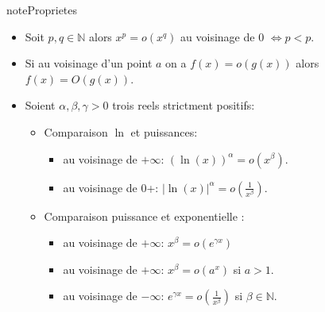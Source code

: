 \documentclass[letterpaper,10pt,french]{jupyterBook}
\begin{document}
\begin{sphinxadmonition}{note}{Proprietes}
\begin{itemize}
\item {} 
\sphinxAtStartPar
Soit \(p, q \in \mathbb{N}\) alors \(x^p = o(x^q)\) au voisinage de \(0\) \(\Leftrightarrow p<p\).

\item {} 
\sphinxAtStartPar
Si au voisinage d’un point \(a\) on a \(f(x) = o(g(x))\) alors \(f(x) = O(g(x))\).

\item {} 
\sphinxAtStartPar
Soient \(\alpha, \beta, \gamma >0\) trois reels strictment positifs:
\begin{itemize}
\item {} 
\sphinxAtStartPar
Comparaison \(\ln\) et puissances:
\begin{itemize}
\item {} 
\sphinxAtStartPar
au voisinage de \(+\infty\): \((\ln(x))^\alpha = o(x^\beta)\).

\item {} 
\sphinxAtStartPar
au voisinage de 0+: \(|\ln(x)|^\alpha = o(\frac{1}{x^\beta})\).

\end{itemize}

\item {} 
\sphinxAtStartPar
Comparaison puissance et exponentielle :
\begin{itemize}
\item {} 
\sphinxAtStartPar
au voisinage de \(+\infty\): \(x^\beta = o(e^{\gamma x})\)

\item {} 
\sphinxAtStartPar
au voisinage de \(+\infty\): \(x^\beta = o(a^{x})\) si \(a>1\).

\item {} 
\sphinxAtStartPar
au voisinage de \(-\infty\): \(e^{\gamma x} = o(\frac{1}{x^\beta})\) si \(\beta \in \mathbb{N}\).

\end{itemize}

\end{itemize}

\end{itemize}
\end{sphinxadmonition}
\end{document}
